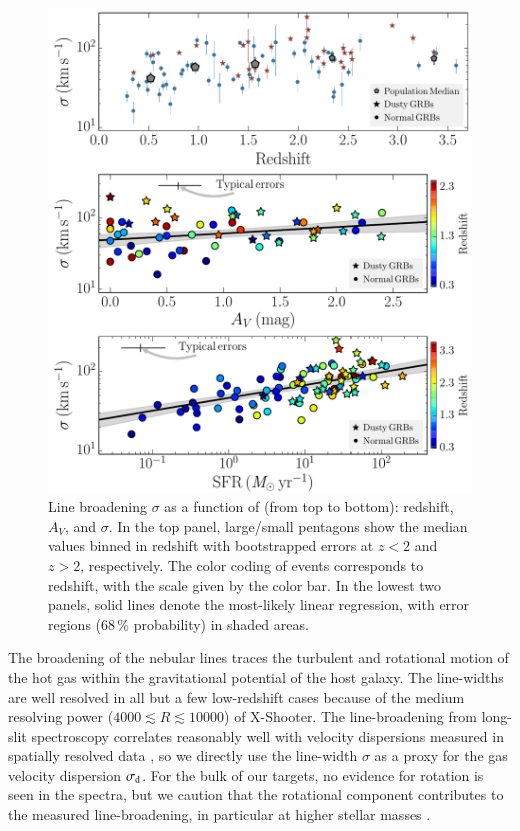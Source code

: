 \documentclass[traditabstract, longauth]{aa}
\begin{document}
\begin{figure}
\includegraphics[angle=0, width=0.99\columnwidth]{Figs/Velo_z.pdf}
\caption{Line broadening $\sigma$ as a function of (from top to bottom): redshift, $A_V$, and $\sigma$. In the top panel, large/small pentagons show the median values binned in redshift with bootstrapped errors at $z<2$ and $z>2$, respectively. The color coding of events corresponds to redshift, with the scale given by the color bar. In the lowest two panels, solid lines denote the most-likely linear regression, with error regions (68\,\% probability) in shaded areas.}
\label{fig:veloz}
\end{figure}

The broadening of the nebular lines traces the turbulent and rotational motion of the hot gas within the gravitational potential of the host galaxy. The line-widths are well resolved in all but a few low-redshift cases because of the medium resolving power ($4000\lesssim R \lesssim 10000$) of X-Shooter. The line-broadening from long-slit spectroscopy correlates reasonably well with velocity dispersions measured in spatially resolved data \citep{2011MNRAS.413..643R}, so we directly use the line-width $\sigma$ as a proxy for the gas velocity dispersion $\sigma_{\rm{d}}$. For the bulk of our targets, no evidence for rotation is seen in the spectra, but we caution that the rotational component contributes to the measured line-broadening, in particular at higher stellar masses \citep[e.g.,][]{2009ApJ...706.1364F}.
\end{document}
